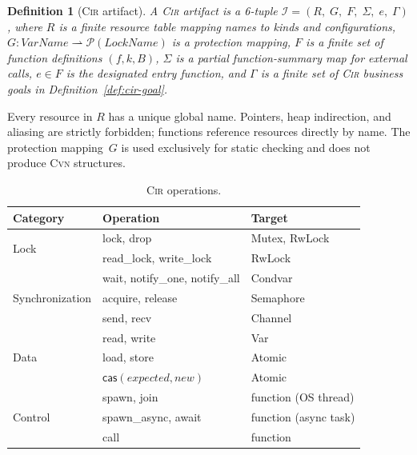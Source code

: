 \documentclass[sigconf]{acmart}
\newtheorem{definition}{Definition}
\begin{document}
\begin{definition}[\textsc{Cir} artifact]
\label{def:cir}
A \textsc{Cir} artifact is a 6-tuple
$\mathcal{I}=(R,\;G,\;F,\;\Sigma,\;e,\;\Gamma)$, where $R$ is a finite resource table mapping names to kinds and configurations, $G:\mathit{VarName}\rightharpoonup\mathcal{P}(\mathit{LockName})$ is a protection mapping, $F$ is a finite set of function definitions $(f,k,B)$, $\Sigma$ is a partial function-summary map for external calls, $e\in F$ is the designated entry function, and $\Gamma$ is a finite set of \textsc{Cir} business goals in Definition~\ref{def:cir-goal}.
\end{definition}

Every resource in $R$ has a unique global name. Pointers, heap indirection, and aliasing are strictly forbidden; functions reference resources directly by name. The protection mapping~$G$ is used exclusively for static checking and does not produce \textsc{Cvn} structures.

\begin{table}[t]
\caption{\textsc{Cir} operations.}
\label{tab:cir-ops}
\centering\footnotesize
\begin{tabular}{@{}llp{3.2cm}@{}}
\toprule
\textbf{Category} & \textbf{Operation} & \textbf{Target} \\
\midrule
\multirow{2}{*}{Lock}
  & \textsf{lock}, \textsf{drop}
  & Mutex, RwLock \\
  & \textsf{read\_lock}, \textsf{write\_lock}
  & RwLock \\[3pt]
\multirow{3}{*}{Synchronization}
  & \textsf{wait}, \textsf{notify\_one}, \textsf{notify\_all}
  & Condvar \\
  & \textsf{acquire}, \textsf{release}
  & Semaphore \\
  & \textsf{send}, \textsf{recv}
  & Channel \\[3pt]
\multirow{3}{*}{Data}
  & \textsf{read}, \textsf{write}
  & Var \\
  & \textsf{load}, \textsf{store}
  & Atomic \\
  & $\textsf{cas}(\mathit{expected},\mathit{new})$
  & Atomic \\[3pt]
\multirow{3}{*}{Control}
  & \textsf{spawn}, \textsf{join}
  & function (OS thread) \\
  & \textsf{spawn\_async}, \textsf{await}
  & function (async task) \\
  & \textsf{call}
  & function \\
\bottomrule
\end{tabular}
\end{table}
\end{document}
